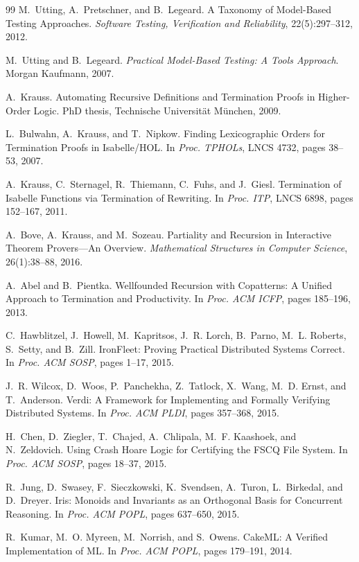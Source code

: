 \documentclass[11pt,a4paper]{article}
\begin{document}
\begin{thebibliography}{99}
M.~Utting, A.~Pretschner, and B.~Legeard.
A Taxonomy of Model-Based Testing Approaches.
\emph{Software Testing, Verification and Reliability}, 22(5):297--312, 2012.

M.~Utting and B.~Legeard.
\emph{Practical Model-Based Testing: A Tools Approach}.
Morgan Kaufmann, 2007.

A.~Krauss.
Automating Recursive Definitions and Termination Proofs in Higher-Order
Logic.
PhD thesis, Technische Universit\"at M\"unchen, 2009.

L.~Bulwahn, A.~Krauss, and T.~Nipkow.
Finding Lexicographic Orders for Termination Proofs in Isabelle/HOL.
In \emph{Proc. TPHOLs}, LNCS 4732, pages 38--53, 2007.

A.~Krauss, C.~Sternagel, R.~Thiemann, C.~Fuhs, and J.~Giesl.
Termination of Isabelle Functions via Termination of Rewriting.
In \emph{Proc. ITP}, LNCS 6898, pages 152--167, 2011.

A.~Bove, A.~Krauss, and M.~Sozeau.
Partiality and Recursion in Interactive Theorem Provers---An Overview.
\emph{Mathematical Structures in Computer Science}, 26(1):38--88, 2016.

A.~Abel and B.~Pientka.
Wellfounded Recursion with Copatterns: A Unified Approach to Termination
and Productivity.
In \emph{Proc. ACM ICFP}, pages 185--196, 2013.

C.~Hawblitzel, J.~Howell, M.~Kapritsos, J.~R. Lorch, B.~Parno,
M.~L. Roberts, S.~Setty, and B.~Zill.
IronFleet: Proving Practical Distributed Systems Correct.
In \emph{Proc. ACM SOSP}, pages 1--17, 2015.

J.~R. Wilcox, D.~Woos, P.~Panchekha, Z.~Tatlock, X.~Wang, M.~D. Ernst,
and T.~Anderson.
Verdi: A Framework for Implementing and Formally Verifying Distributed
Systems.
In \emph{Proc. ACM PLDI}, pages 357--368, 2015.

H.~Chen, D.~Ziegler, T.~Chajed, A.~Chlipala, M.~F. Kaashoek, and
N.~Zeldovich.
Using Crash Hoare Logic for Certifying the FSCQ File System.
In \emph{Proc. ACM SOSP}, pages 18--37, 2015.

R.~Jung, D.~Swasey, F.~Sieczkowski, K.~Svendsen, A.~Turon, L.~Birkedal,
and D.~Dreyer.
Iris: Monoids and Invariants as an Orthogonal Basis for Concurrent
Reasoning.
In \emph{Proc. ACM POPL}, pages 637--650, 2015.

R.~Kumar, M.~O. Myreen, M.~Norrish, and S.~Owens.
CakeML: A Verified Implementation of ML.
In \emph{Proc. ACM POPL}, pages 179--191, 2014.


\end{thebibliography}
\end{document}
